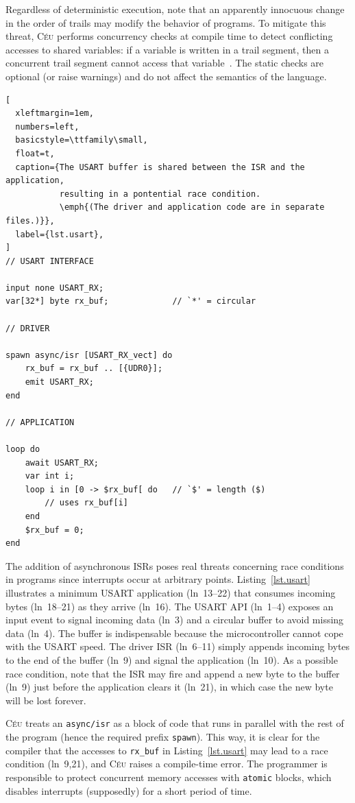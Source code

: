 \documentclass[sigplan,10pt,review,anonymous]{acmart}\settopmatter{printfolios=true,printccs=false,printacmref=false}
\newcommand{\CEU}{\textsc{C\'{e}u}\xspace}
\newcommand{\code}[1] {{\small{\texttt{#1}}}}
\begin{document}
Regardless of deterministic execution, note that an apparently innocuous change
in the order of trails may modify the behavior of programs.
%
To mitigate this threat, \CEU performs concurrency checks at compile time to
detect conflicting accesses to shared variables:
if a variable is written in a trail segment, then a concurrent trail segment
cannot access that variable~\cite{ceu.sensys13}.
%
The static checks are optional (or raise warnings) and do not affect the
semantics of the language.

\begin{lstlisting}[
  xleftmargin=1em,
  numbers=left,
  basicstyle=\ttfamily\small,
  float=t,
  caption={The USART buffer is shared between the ISR and the application,
           resulting in a pontential race condition.
           \emph{(The driver and application code are in separate files.)}},
  label={lst.usart},
]
// USART INTERFACE

input none USART_RX;
var[32*] byte rx_buf;             // `*' = circular

// DRIVER

spawn async/isr [USART_RX_vect] do
    rx_buf = rx_buf .. [{UDR0}];
    emit USART_RX;
end

// APPLICATION

loop do
    await USART_RX;
    var int i;
    loop i in [0 -> $rx_buf[ do   // `$' = length ($)
        // uses rx_buf[i]
    end
    $rx_buf = 0;
end
\end{lstlisting}

The addition of asynchronous ISRs poses real threats concerning race conditions
in programs since interrupts occur at arbitrary points.
%
Listing~\ref{lst.usart} illustrates a minimum USART application (ln~13--22)
that consumes incoming bytes (ln~18--21) as they arrive (ln~16).
%
The USART API (ln~1--4) exposes an input event to signal incoming data (ln~3)
and a circular buffer to avoid missing data (ln~4).
The buffer is indispensable because the microcontroller cannot cope with the
USART speed.
%
The driver ISR (ln~6--11) simply appends incoming bytes to the end of the
buffer (ln~9) and signal the application (ln~10).
%
As a possible race condition, note that the ISR may fire and append a new byte
to the buffer (ln~9) just before the application clears it (ln~21), in which
case the new byte will be lost forever.

\CEU treats an \code{async/isr} as a block of code that runs in parallel with
the rest of the program (hence the required prefix \code{spawn}).
%
This way, it is clear for the compiler that the accesses to \code{rx\_buf} in
Listing~\ref{lst.usart} may lead to a race condition (ln~9,21), and \CEU raises
a compile-time error.
%
The programmer is responsible to protect concurrent memory accesses with
\code{atomic} blocks, which disables interrupts (supposedly) for a short period
of time.
\end{document}
